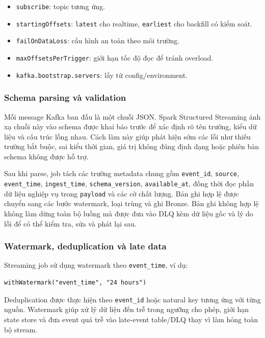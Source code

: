 \documentclass[12pt,a4paper]{article}
\newcommand{\tightlist}{\setlength{\itemsep}{0pt}\setlength{\parskip}{0pt}}
\begin{document}
\begin{itemize}
\tightlist
\item
  \texttt{subscribe}: topic tương ứng.
\item
  \texttt{startingOffsets}: \texttt{latest} cho realtime, \texttt{earliest} cho backfill có kiểm soát.
\item
  \texttt{failOnDataLoss}: cấu hình an toàn theo môi trường.
\item
  \texttt{maxOffsetsPerTrigger}: giới hạn tốc độ đọc để tránh overload.
\item
  \texttt{kafka.bootstrap.servers}: lấy từ config/environment.
\end{itemize}

\subsubsection{Schema parsing và validation}\label{schema-parsing-vuxe0-validation}

Mỗi message Kafka ban đầu là một chuỗi JSON. Spark Structured Streaming ánh xạ chuỗi này vào schema được khai báo trước để xác định rõ tên trường, kiểu dữ liệu và cấu trúc lồng nhau. Cách làm này giúp phát hiện sớm các lỗi như thiếu trường bắt buộc, sai kiểu thời gian, giá trị không đúng định dạng hoặc phiên bản schema không được hỗ trợ.

Sau khi parse, job tách các trường metadata chung gồm \texttt{event\_id}, \texttt{source}, \texttt{event\_time}, \texttt{ingest\_time}, \texttt{schema\_version}, \texttt{available\_at}, đồng thời đọc phần dữ liệu nghiệp vụ trong \texttt{payload} và các cờ chất lượng. Bản ghi hợp lệ được chuyển sang các bước watermark, loại trùng và ghi Bronze. Bản ghi không hợp lệ không làm dừng toàn bộ luồng mà được đưa vào DLQ kèm dữ liệu gốc và lý do lỗi để có thể kiểm tra, sửa và phát lại sau.

\subsubsection{Watermark, deduplication và late data}\label{watermark-deduplication-vuxe0-late-data}

Streaming job sử dụng watermark theo \texttt{event\_time}, ví dụ:

\begin{verbatim}
withWatermark("event_time", "24 hours")
\end{verbatim}

Deduplication được thực hiện theo \texttt{event\_id} hoặc natural key tương ứng với từng nguồn. Watermark giúp xử lý dữ liệu đến trễ trong ngưỡng cho phép, giới hạn state store và đưa event quá trễ vào late-event table/DLQ thay vì làm hỏng toàn bộ stream.
\end{document}
